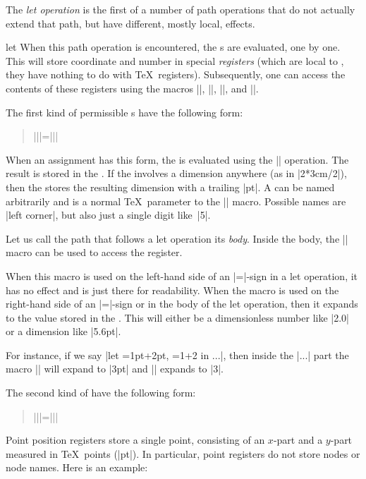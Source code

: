The \emph{let operation} is the first of a number of path operations that do
not actually extend that path, but have different, mostly local, effects.

\begin{pathoperation}{let}{
        }
    When this path operation is encountered, the s are
    evaluated, one by one. This will store coordinate and number in
    special \emph{registers} (which are local to \tikzname, they have
    nothing to do with \TeX\ registers). Subsequently, one can access the
    contents of these registers using the macros |\p|, |\x|, |\y|, and
    |\n|.

    The first kind of permissible s have the following form:
    \begin{quote}
        |\n||={||}|
    \end{quote}
    When an assignment has this form, the  is evaluated using the
    |\pgfmathparse| operation. The result is stored in the . If the  involves a dimension anywhere (as in
    |2*3cm/2|), then the  stores the resulting dimension
    with a trailing |pt|.  A  can be named arbitrarily
    and is a normal \TeX\ parameter to the |\n| macro. Possible names are
    |{left corner}|, but also just a single digit like~|5|.

    Let us call the path that follows a let operation its \emph{body}. Inside
    the body, the |\n| macro can be used to access the register.
    \begin{command}{\n{}}
        When this macro is used on the left-hand side of an |=|-sign in a let
        operation, it has no effect and is just there for readability. When the
        macro is used on the right-hand side of an |=|-sign or in the body of
        the let operation, then it expands to the value stored in the
        . This will either be a dimensionless number like
        |2.0| or a dimension like |5.6pt|.

        For instance, if we say |let ={1pt+2pt}, ={1+2} in ...|, then
        inside the |...| part the macro || will expand to |3pt| and ||
        expands to |3|.
    \end{command}

    The second kind of  have the following form:
    \begin{quote}
        |\p||={||}|
    \end{quote}
    Point position registers store a single point, consisting of an $x$-part
    and a $y$-part measured in \TeX\ points (|pt|). In particular, point
    registers do not store nodes or node names. Here is an example:
\begin{codeexample}[]
\end{codeexample}
\end{pathoperation}
